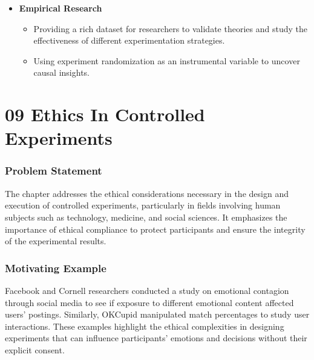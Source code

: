 \documentclass{article}
\begin{document}
\begin{itemize}
    \item \textbf{Empirical Research}
    \begin{itemize}
        \item Providing a rich dataset for researchers to validate theories and study the effectiveness of different experimentation strategies.
        \item Using experiment randomization as an instrumental variable to uncover causal insights.
    \end{itemize}
\end{itemize}

\section*{09 Ethics In Controlled Experiments}
\subsubsection*{Problem Statement}
The chapter addresses the ethical considerations necessary in the design and execution of controlled experiments, particularly in fields involving human subjects such as technology, medicine, and social sciences. It emphasizes the importance of ethical compliance to protect participants and ensure the integrity of the experimental results.

\subsubsection*{Motivating Example}
Facebook and Cornell researchers conducted a study on emotional contagion through social media to see if exposure to different emotional content affected users' postings. Similarly, OKCupid manipulated match percentages to study user interactions. These examples highlight the ethical complexities in designing experiments that can influence participants' emotions and decisions without their explicit consent.
\end{document}
